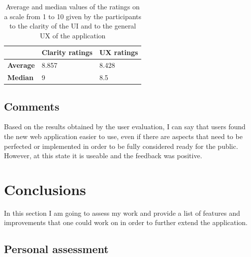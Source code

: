 \documentclass[]{usiinfbachelorproject}
\begin{document}
\begin{table}[h!]
\centering
\begin{tabular}{|l|l|l|}
\hline
 & \textbf{Clarity ratings} & \textbf{UX ratings} \\ \hline
\textbf{Average} & 8.857 & 8.428 \\ \hline
\textbf{Median} & 9 & 8.5 \\ \hline
\end{tabular}
\caption{Average and median values of the ratings on a scale from 1 to 10 given by the participants to the clarity of the UI and to the general UX of the application}
\end{table}

\subsection{Comments}

Based on the results obtained by the user evaluation, I can say that users found the new web application easier to use, even if there are aspects that need to be perfected or implemented in order to be fully considered ready for the public. However, at this state it is useable and the feedback was positive.

\vspace{\fill}
\pagebreak

\section{Conclusions} \label{Conclusions}

In this section I am going to assess my work and provide a list of features and improvements that one could work on in order to further extend the application.

\subsection{Personal assessment}
\end{document}

